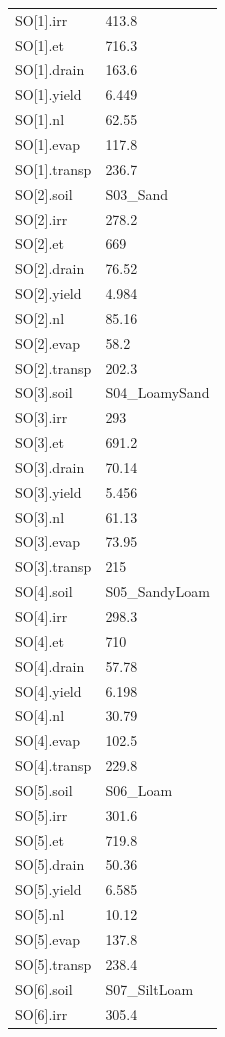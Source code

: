 {\begin{longtable}{p{}p{}}
{}SO[1].irr & 413.8\\
{}SO[1].et & 716.3\\
{}SO[1].drain & 163.6\\
{}SO[1].yield & 6.449\\
{}SO[1].nl & 62.55\\
{}SO[1].evap & 117.8\\
{}SO[1].transp & 236.7\\
{}SO[2].soil & S03\_Sand\\
{}SO[2].irr & 278.2\\
{}SO[2].et & 669\\
{}SO[2].drain & 76.52\\
{}SO[2].yield & 4.984\\
{}SO[2].nl & 85.16\\
{}SO[2].evap & 58.2\\
{}SO[2].transp & 202.3\\
{}SO[3].soil & S04\_LoamySand\\
{}SO[3].irr & 293\\
{}SO[3].et & 691.2\\
{}SO[3].drain & 70.14\\
{}SO[3].yield & 5.456\\
{}SO[3].nl & 61.13\\
{}SO[3].evap & 73.95\\
{}SO[3].transp & 215\\
{}SO[4].soil & S05\_SandyLoam\\
{}SO[4].irr & 298.3\\
{}SO[4].et & 710\\
{}SO[4].drain & 57.78\\
{}SO[4].yield & 6.198\\
{}SO[4].nl & 30.79\\
{}SO[4].evap & 102.5\\
{}SO[4].transp & 229.8\\
{}SO[5].soil & S06\_Loam\\
{}SO[5].irr & 301.6\\
{}SO[5].et & 719.8\\
{}SO[5].drain & 50.36\\
{}SO[5].yield & 6.585\\
{}SO[5].nl & 10.12\\
{}SO[5].evap & 137.8\\
{}SO[5].transp & 238.4\\
{}SO[6].soil & S07\_SiltLoam\\
{}SO[6].irr & 305.4\\

\end{longtable}}
